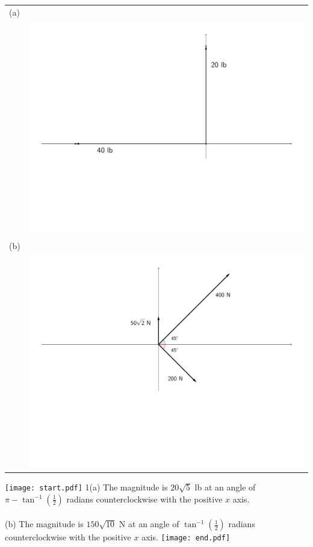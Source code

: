 \documentclass[12pt]{article}
\begin{document}
\begin{enumerate}
\begin{tabular}{ll}
(a) & \\
 & \includegraphics[scale=0.4]{vector7.pdf}\\
(b) & \\
 & \includegraphics[scale=0.4]{vector8.pdf}\\
\end{tabular}

\texttt{[image: start.pdf]}
{{{1\linewidth}{(a) The magnitude is $20\sqrt{5}$ lb at an angle of $\pi-\tan^{-1}\left(\frac{1}{2}\right)$ radians counterclockwise with the positive $x$ axis.\\
\\
(b) The magnitude is $150\sqrt{10}$ N at an angle of $\tan^{-1}\left(\frac{1}{2}\right)$ radians counterclockwise with the positive $x$ axis.}}}
\texttt{[image: end.pdf]}



\end{enumerate}
\end{document}
